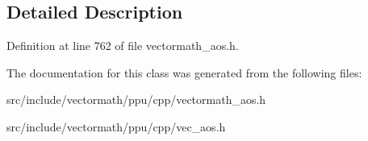 \subsection{Detailed Description}


Definition at line 762 of file vectormath\-\_\-aos.\-h.



The documentation for this class was generated from the following files\-:\begin{DoxyCompactItemize}
\item 
src/include/vectormath/ppu/cpp/vectormath\-\_\-aos.\-h\item 
src/include/vectormath/ppu/cpp/vec\-\_\-aos.\-h\end{DoxyCompactItemize}

